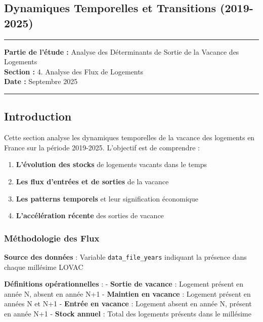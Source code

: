 \documentclass[11pt]{article}
\providecommand{\tightlist}{%
      \setlength{\itemsep}{0pt}\setlength{\parskip}{0pt}}
\begin{document}
\subsection{Dynamiques Temporelles et Transitions
(2019-2025)}\label{dynamiques-temporelles-et-transitions-2019-2025}

\begin{center}\rule{0.5\linewidth}{0.5pt}\end{center}

\textbf{Partie de l'étude :} Analyse des Déterminants de Sortie de la
Vacance des Logements\\
\textbf{Section :} 4. Analyse des Flux de Logements\\
\textbf{Date :} Septembre 2025

\begin{center}\rule{0.5\linewidth}{0.5pt}\end{center}

\subsection{Introduction}\label{introduction}

Cette section analyse les dynamiques temporelles de la vacance des
logements en France sur la période 2019-2025. L'objectif est de
comprendre :

\begin{enumerate}
\def\labelenumi{\arabic{enumi}.}
\tightlist
\item
  \textbf{L'évolution des stocks} de logements vacants dans le temps
\item
  \textbf{Les flux d'entrées et de sorties} de la vacance
\item
  \textbf{Les patterns temporels} et leur signification économique
\item
  \textbf{L'accélération récente} des sorties de vacance
\end{enumerate}

\subsubsection{Méthodologie des Flux}\label{muxe9thodologie-des-flux}

\textbf{Source des données} : Variable \texttt{data\_file\_years}
indiquant la présence dans chaque millésime LOVAC

\textbf{Définitions opérationnelles} : - \textbf{Sortie de vacance} :
Logement présent en année N, absent en année N+1 - \textbf{Maintien en
vacance} : Logement présent en années N et N+1 - \textbf{Entrée en
vacance} : Logement absent en année N, présent en année N+1 -
\textbf{Stock annuel} : Total des logements présents dans le millésime
\end{document}
